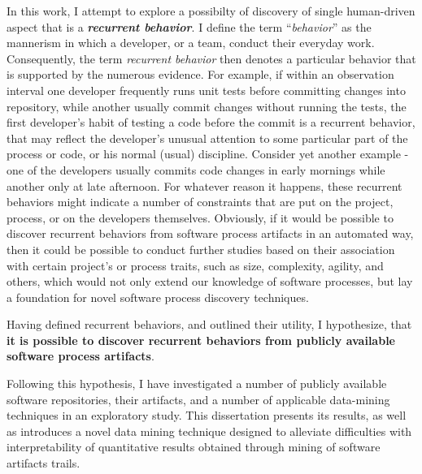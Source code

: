 In this work, I attempt to explore a possibilty of discovery of single human-driven aspect that is a 
\textit{\textbf{recurrent behavior}}. 
I define the term ``\textit{behavior}'' as the mannerism in which a developer, or a team, conduct 
their everyday work. Consequently, the term \textit{recurrent behavior} then denotes a particular 
behavior that is supported by the numerous evidence. 
For example, if within an observation interval one developer frequently runs unit tests before committing 
changes into repository, while another usually commit changes without running the tests, the first developer's
habit of testing a code before the commit is a recurrent behavior, that may reflect the developer's unusual 
attention to some particular part of the process or code, or his normal (usual) discipline. 
Consider yet another example - one of the developers usually commits code changes in early mornings while 
another only at late afternoon. For whatever reason it happens, these recurrent behaviors might indicate 
a number of constraints that are put on the project, process, or on the developers themselves.
Obviously, if it would be possible to discover recurrent behaviors from software process artifacts in an
automated way, then it could be possible to conduct further studies based on their association with 
certain project's or process traits, such as size, complexity, agility, and others, which would not only 
extend our knowledge of software processes, but lay a foundation for novel software process discovery techniques.

Having defined recurrent behaviors, and outlined their utility, I hypothesize, 
that \textbf{it is possible to discover recurrent behaviors from publicly available software process artifacts}. 

Following this hypothesis, I have investigated a number of publicly available software repositories,
their artifacts, and a number of applicable data-mining techniques in an exploratory study.
This dissertation presents its results, as well as introduces a novel data mining technique designed to 
alleviate difficulties with interpretability of quantitative results obtained through mining of software
artifacts trails. 

%
%
